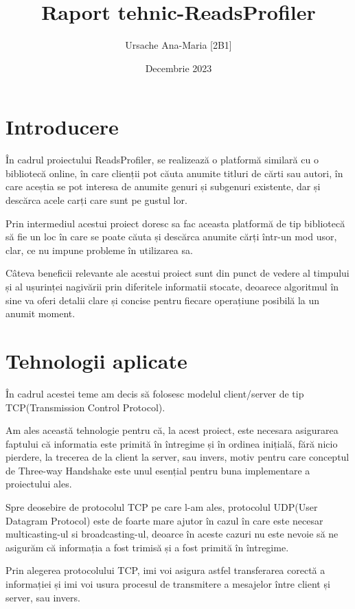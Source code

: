\documentclass{article}
\title{Raport tehnic-ReadsProfiler}
\author{Ursache Ana-Maria [2B1]}
\date{Decembrie 2023}
\begin{document}
\maketitle

\section{Introducere}
\hspace{0.5cm}În cadrul proiectului ReadsProfiler, se realizează o platformă similară cu o bibliotecă online, în care clienții pot căuta anumite titluri de cărti sau autori, în care aceștia se pot interesa de anumite genuri și subgenuri existente, dar și descărca acele carți care sunt pe gustul lor.

Prin intermediul acestui proiect doresc sa fac aceasta platformă de tip bibliotecă să fie un loc în care se poate căuta și descărca anumite cărți într-un mod usor, clar, ce nu impune probleme în utilizarea sa.

Câteva beneficii relevante ale acestui proiect sunt din punct de vedere al timpului și al ușurinței nagivării prin diferitele informatii stocate, deoarece algoritmul în sine va oferi detalii clare și concise pentru fiecare operațiune posibilă la un anumit moment.
\section{Tehnologii aplicate}
\hspace{0.5cm}În cadrul acestei teme am decis să folosesc modelul client/server de tip TCP(Transmission Control Protocol). 

Am ales această tehnologie pentru că, la acest proiect, este necesara asigurarea faptului că informatia este primită în întregime și în ordinea inițială, fără nicio pierdere, la trecerea de la client la server, sau invers, motiv pentru care conceptul de Three-way Handshake este unul esențial pentru buna implementare a proiectului ales.

Spre deosebire de protocolul TCP pe care l-am ales, protocolul UDP(User Datagram Protocol) este de foarte mare ajutor în cazul în care este necesar multicasting-ul si broadcasting-ul, deoarce în aceste cazuri nu este nevoie să ne asigurăm că informația a fost trimisă și a fost primită în întregime.

Prin alegerea protocolului TCP, imi voi asigura astfel transferarea corectă a informației și imi voi usura procesul de transmitere a mesajelor între client și server, sau invers.
\end{document}
